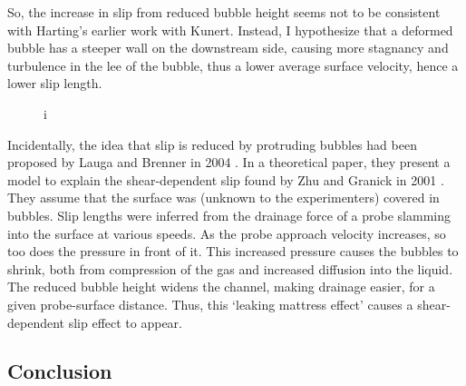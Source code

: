 \documentclass[12pt, a4paper, twoside, openright]{book}
\begin{document}
So, the increase in slip from reduced bubble height seems not to be consistent with Harting's earlier work with Kunert.  Instead, I hypothesize that a deformed bubble has a steeper wall on the downstream side, causing more stagnancy and turbulence in the lee of the bubble, thus a lower average surface velocity, hence a lower slip length.

\begin{figure}[ht]
\centering
{}
\caption{i}\label{i}
\end{figure}


Incidentally, the idea that slip is reduced by protruding bubbles had been proposed by Lauga and Brenner in 2004 \cite{LaugaBrenner2004}.  In a theoretical paper, they present a model to explain the shear-dependent slip found by Zhu and Granick in 2001 \cite{ZhuGranick2001}.  They assume that the surface was (unknown to the experimenters) covered in bubbles.  Slip lengths were inferred from the drainage force of a probe slamming into the surface at various speeds. As the probe approach velocity increases, so too does the pressure in front of it.  This increased pressure causes the bubbles to shrink, both from compression of the gas and increased diffusion into the liquid.  The reduced bubble height widens the channel, making drainage easier, for a given probe-surface distance.  Thus, this `leaking mattress effect' causes a
\nopagebreak[0] shear-dependent slip effect to appear.


\subsection*{Conclusion}
\end{document}
